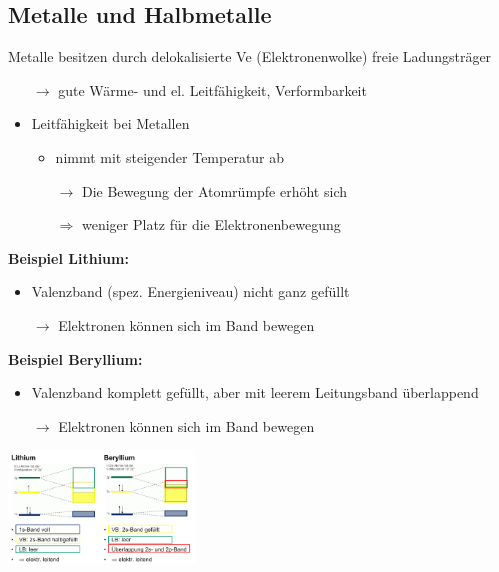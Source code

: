 \subsection{Metalle und Halbmetalle}
    Metalle besitzen durch delokalisierte Ve (Elektronenwolke) freie Ladungsträger 
    \begin{itemize}
        \item[$\rightarrow$] gute Wärme- und el. Leitfähigkeit, Verformbarkeit
        \item Leitfähigkeit bei Metallen
        \begin{itemize}
            \item nimmt mit steigender Temperatur ab
            
                $\rightarrow$ Die Bewegung der Atomrümpfe erhöht sich
                
                $\Rightarrow$ weniger Platz für die Elektronenbewegung
        \end{itemize}
    \end{itemize}
    \begin{minipage}{0.48\columnwidth}
        \textbf{Beispiel Lithium:}
            \begin{itemize}
                \item Valenzband (spez. Energieniveau) nicht ganz gefüllt
                
                    $\rightarrow$ Elektronen können sich im Band bewegen
            \end{itemize}
    \end{minipage}
    \hfill
    \begin{minipage}{0.48\columnwidth}
        \textbf{Beispiel Beryllium:}
            \begin{itemize}
                \item Valenzband komplett gefüllt, aber mit leerem Leitungsband überlappend
                
                    $\rightarrow$ Elektronen können sich im Band bewegen
            \end{itemize} 
    \end{minipage}
    \begin{center}
        \includegraphics[height=3cm]{pictures/Baender.png}
    \end{center}
